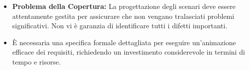     \begin{tcolorbox}[colback=red!5!white,colframe=red!75!black,title=Limitazioni]
    \begin{itemize}
      \item \textbf{Problema della Copertura:} La progettazione degli scenari deve 
      essere attentamente gestita per assicurare che non vengano tralasciati problemi significativi. Non vi è garanzia di identificare tutti i difetti importanti.
      \item È necessaria una specifica formale 
      dettagliata per eseguire un'animazione efficace dei requisiti, richiedendo 
      un investimento considerevole in termini di tempo e risorse.
    \end{itemize}
\end{tcolorbox}